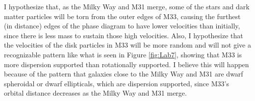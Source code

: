 \documentclass[trackchanges, twocolumn]{aastex7}
\begin{document}
I hypothesize that, as the Milky Way and M31 merge, some of the stars and dark matter particles will be torn from the outer edges of M33, causing the furthest (in distance) edges of the phase diagram to have lower velocities than initially, since there is less mass to sustain those high velocities. Also, I hypothesize that the velocities of the disk particles in M33 will be more random and will not give a recognizable pattern like what is seen in Figure \ref{fig:Lab7}, showing that M33 is more dispersion supported than rotationally supported. I believe this will happen because of the pattern that galaxies close to the Milky Way and M31 are dwarf spheroidal or dwarf ellipticals, which are dispersion supported, since M33's orbital distance decreases as the Milky Way and M31 merge.


{}

\end{document}
